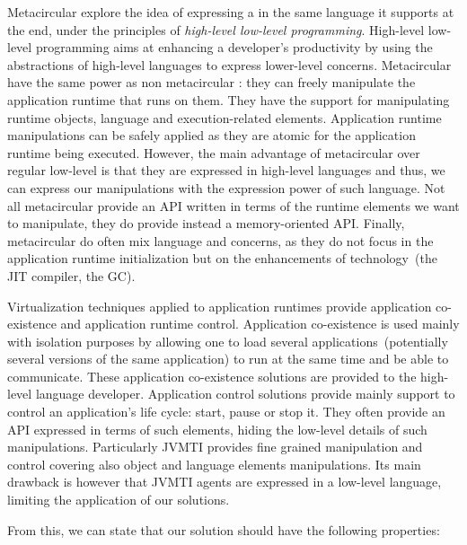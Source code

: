 Metacircular \VMs explore the idea of expressing a \VM in the same language it supports at the end, under the principles of \emph{high-level low-level programming}. High-level low-level programming aims at enhancing a developer's productivity by using the abstractions of high-level languages to express lower-level concerns. Metacircular \VMs have the same power as non metacircular \VMs: they can freely manipulate the application runtime that runs on them. They have the support for manipulating runtime objects, language and execution-related elements. Application runtime manipulations can be safely applied as they are atomic for the application runtime being executed. However, the main advantage of metacircular \VMs over regular low-level \VMs is that they are expressed in high-level languages and thus, we can express our manipulations with the expression power of such language. Not all metacircular \VMs provide an API written in terms of the runtime elements we want to manipulate, they do provide instead a memory-oriented API. Finally, metacircular \VMs do often mix language and \VM concerns, as they do not focus in the application runtime initialization but on the enhancements of \VM technology~(\eg the JIT compiler, the GC).

Virtualization techniques applied to application runtimes provide application co-existence and application runtime control. Application co-existence is used mainly with isolation purposes by allowing one to load several applications~(potentially several versions of the same application) to run at the same time and be able to communicate. These application co-existence solutions are provided to the high-level language developer. Application control solutions provide mainly support to control an application's life cycle: start, pause or stop it. They often provide an API expressed in terms of such elements, hiding the low-level details of such manipulations. Particularly JVMTI provides fine grained manipulation and control covering also object and language elements manipulations. Its main drawback is however that JVMTI agents are expressed in a low-level language, limiting the application of our solutions.

From this, we can state that our solution should have the following properties:

